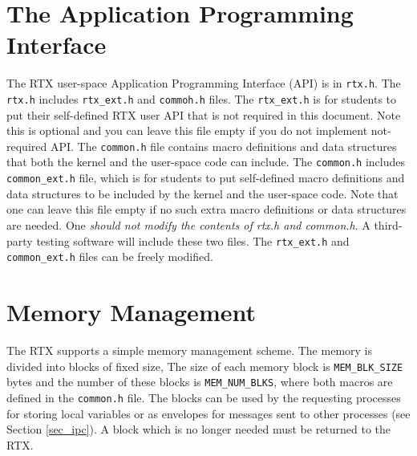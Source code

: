 \section{The Application Programming Interface}
\label{sec_rtx_api}
The RTX user-space Application Programming Interface (API) is in \verb+rtx.h+. The \verb+rtx.h+ includes \verb+rtx_ext.h+ and \verb+commoh.h+ files. The \verb+rtx_ext.h+ is for students to put their self-defined RTX user API that is not required in this document. Note this is optional and you can leave this file empty if you do not implement not-required API. The \verb+common.h+ file contains macro definitions and data structures that both the kernel and the user-space code can include. The \verb+common.h+ includes \verb+common_ext.h+ file, which is for students to put self-defined macro definitions and data structures to be included by the kernel and the user-space code. Note that one can leave this file empty if no such extra macro definitions or data structures are needed. One {\em should not modify the contents of rtx.h and common.h}. A third-party testing software will include these two files. The \verb+rtx_ext.h+ and \verb+common_ext.h+ files can be freely modified.

\section{Memory Management}
\label{sec_memory}

The RTX supports a simple memory management scheme. The memory is divided into blocks of fixed size,
The size of each memory block is \verb+MEM_BLK_SIZE+ bytes and the number of these blocks is \verb+MEM_NUM_BLKS+, where both macros are defined in the \verb+common.h+ file.
The blocks can be used by the requesting processes for storing local variables or as envelopes for messages sent to other processes (see Section \ref{sec_ipc}). A block which is no longer needed must be returned to the RTX. \\

